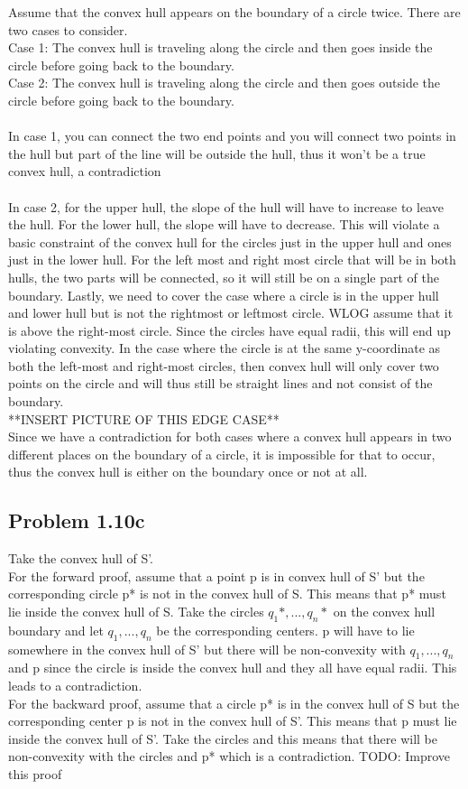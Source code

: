 \documentclass[11pt,psfig]{article}
\begin{document}
Assume that the convex hull appears on the boundary of a circle twice. There are two cases to consider.\\
Case 1: The convex hull is traveling along the circle and then goes inside the circle before going back to the boundary. \\
Case 2: The convex hull is traveling along the circle and then goes outside the circle before going back to the boundary.\\
\\
In case 1, you can connect the two end points and you will connect two points in the hull but part of the line will be outside the hull, thus it won't be a true convex hull, a contradiction\\
\\
In case 2, for the upper hull, the slope of the hull will have to increase to leave the hull. For the lower hull, the slope will have to decrease. This will violate a basic constraint of the convex hull for the circles just in the upper hull and ones just in the lower hull. For the left most and right most circle that will be in both hulls, the two parts will be connected, so it will still be on a single part of the boundary. Lastly, we need to cover the case where a circle is in the upper hull and lower hull but is not the rightmost or leftmost circle. WLOG assume that it is above the right-most circle. Since the circles have equal radii, this will end up violating convexity. In the case where the circle is at the same y-coordinate as both the left-most and right-most circles, then convex hull will only cover two points on the circle and will thus still be straight lines and not consist of the boundary.
\\
**INSERT PICTURE OF THIS EDGE CASE**
\\
Since we have a contradiction for both cases where a convex hull appears in two different places on the boundary of a circle, it is impossible for that to occur, thus the convex hull is either on the boundary once or not at all. 

\subsection*{Problem 1.10c}

Take the convex hull of S'. \\
For the forward proof, assume that a point p is in convex hull of S' but the corresponding circle p* is not in the convex hull of S. This means that p* must lie inside the convex hull of S. Take the circles $q_1*,...,q_n*$ on the convex hull boundary and let $q_1,...,q_n$ be the corresponding centers. p will have to lie somewhere in the convex hull of S' but there will be non-convexity with $q_1,...,q_n$ and p since the circle is inside the convex hull and they all have equal radii. This leads to a contradiction. \\
For the backward proof, assume that a circle p* is in the convex hull of S but the corresponding center p is not in the convex hull of S'. This means that p must lie inside the convex hull of S'. Take the circles and this means that there will be non-convexity with the circles and p* which is a contradiction.
TODO: Improve this proof
\end{document}
